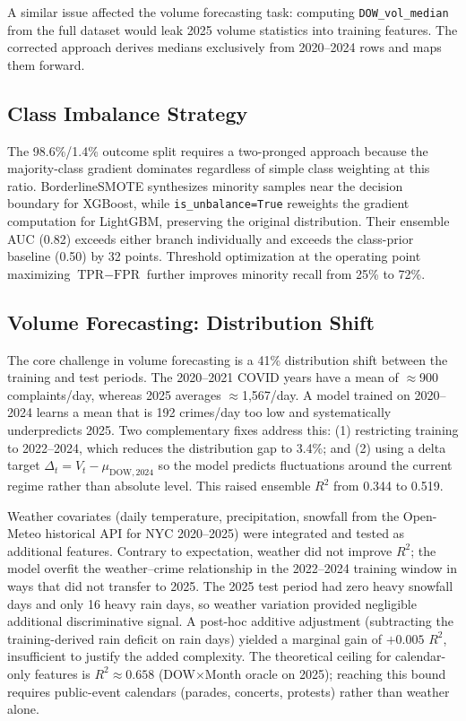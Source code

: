 \documentclass[conference]{IEEEtran}
\begin{document}
A similar issue affected the volume forecasting task: computing \texttt{DOW\_vol\_median} from the full dataset would leak 2025 volume statistics into training features. The corrected approach derives medians exclusively from 2020--2024 rows and maps them forward.

\subsection{Class Imbalance Strategy}

The 98.6\%/1.4\% outcome split requires a two-pronged approach because the majority-class gradient dominates regardless of simple class weighting at this ratio. BorderlineSMOTE synthesizes minority samples near the decision boundary for XGBoost, while \texttt{is\_unbalance=True} reweights the gradient computation for LightGBM, preserving the original distribution. Their ensemble AUC (0.82) exceeds either branch individually and exceeds the class-prior baseline (0.50) by 32 points. Threshold optimization at the operating point maximizing $\text{TPR} - \text{FPR}$ further improves minority recall from 25\% to 72\%.

\subsection{Volume Forecasting: Distribution Shift}

The core challenge in volume forecasting is a 41\% distribution shift between the training and test periods. The 2020--2021 COVID years have a mean of $\approx$900 complaints/day, whereas 2025 averages $\approx$1,567/day. A model trained on 2020--2024 learns a mean that is 192 crimes/day too low and systematically underpredicts 2025. Two complementary fixes address this: (1) restricting training to 2022--2024, which reduces the distribution gap to 3.4\%; and (2) using a delta target $\Delta_t = V_t - \mu_{\text{DOW},2024}$ so the model predicts fluctuations around the current regime rather than absolute level. This raised ensemble $R^2$ from 0.344 to 0.519.

Weather covariates (daily temperature, precipitation, snowfall from the Open-Meteo historical API for NYC 2020--2025) were integrated and tested as additional features. Contrary to expectation, weather did not improve $R^2$; the model overfit the weather--crime relationship in the 2022--2024 training window in ways that did not transfer to 2025. The 2025 test period had zero heavy snowfall days and only 16 heavy rain days, so weather variation provided negligible additional discriminative signal. A post-hoc additive adjustment (subtracting the training-derived rain deficit on rain days) yielded a marginal gain of $+0.005$ $R^2$, insufficient to justify the added complexity. The theoretical ceiling for calendar-only features is $R^2 \approx 0.658$ (DOW$\times$Month oracle on 2025); reaching this bound requires public-event calendars (parades, concerts, protests) rather than weather alone.
\end{document}
